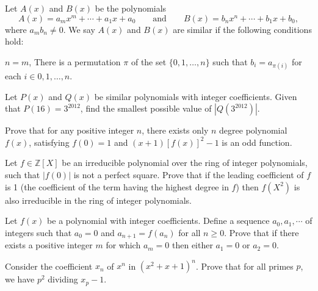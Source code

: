 \documentclass[12pt,a4paper]{memoir}
\theoremstyle{definition}
\begin{document}
\begin{question}[name={2013 Serbia TST}]
	Let $A(x)$ and $B(x)$ be the polynomials \[A(x) = a_m x^m +\cdots +a_1 x+a_0 \qquad \text{and} \qquad B(x) = b_n x^n +\cdots+b_1 x+b_0,\]
	where $a_m b_n \neq 0$. We say $A(x)$ and $B(x)$ are similar if the following conditions hold:
	\begin{tasks}
		\task $n=m$,
		\task There is a permutation $\pi$ of the set $\{ 0, 1, \dots , n\}$ such that $b_i = a_{\pi (i)}$ for each $i \in {0, 1, \dots , n}$.
	\end{tasks}
	Let $P(x)$ and $Q(x)$ be similar polynomials with integer coefficients. Given that $P(16) = 3^{2012}$, find the smallest possible value of $|Q(3^{2012})|$.
\end{question}

\begin{question}[name={2007 China TST}]
	Prove that for any positive integer $n$, there exists only $n$ degree polynomial $f(x)$, satisfying $f(0) = 1$ and $(x + 1)[f(x)]^2 - 1$ is an odd function.
\end{question}


\begin{question}[name={2003 Romania TST}]
	Let $f\in\mathbb{Z}[X]$ be an irreducible polynomial over the ring of integer polynomials, such that $|f(0)|$ is not a perfect square. Prove that if the leading coefficient of $f$ is 1 (the coefficient of the term having the highest degree in $f$) then $f(X^2)$ is also irreducible in the ring of integer polynomials.
\end{question}


\begin{question}[name={2000 Putnam}]
	Let $f(x)$ be a polynomial with integer coefficients. Define a sequence $a_0, a_1, \cdots $ of integers such that $a_0=0$ and $a_{n+1}=f(a_n)$ for all $n \ge 0$. Prove that if there exists a positive integer $m$ for which $a_m=0$ then either $a_1=0$ or $a_2=0$.
\end{question}


\begin{question}[name={Komal}]
	Consider the coefficient $x_n$ of $x^n$ in $(x^2+x+1)^n$. Prove that for all primes $p$, we have $p^2$ dividing $x_p-1$.
\end{question}
\end{document}
